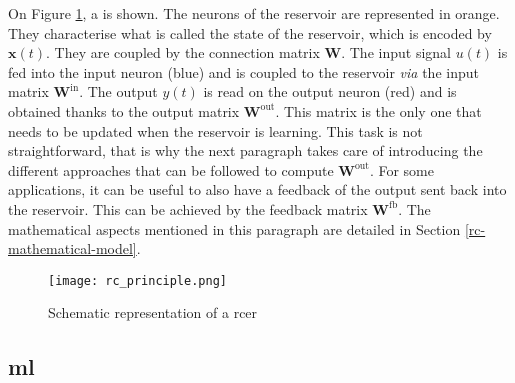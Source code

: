 On Figure \ref{rc_principle}, a \rcer is shown. The neurons of the reservoir are represented in orange. They characterise what is called the state of the reservoir, which is encoded by $\mathbf{x}(t)$. They are coupled by the connection matrix $\mathbf{W}$. The input signal $u(t)$ is fed into the input neuron (blue) and is coupled to the reservoir \textit{via} the input matrix $\mathbf{W}^{\text{in}}$. The output $y(t)$ is read on the output neuron (red) and is obtained thanks to the output matrix $\mathbf{W}^{\text{out}}$. This matrix is the only one that needs to be updated when the reservoir is learning. This task is not straightforward, that is why the next paragraph takes care of introducing the different approaches that can be followed to compute $\mathbf{W}^{\text{out}}$. For some applications, it can be useful to also have a feedback of the output sent back into the reservoir. This can be achieved by the feedback matrix $\mathbf{W}^{\text{fb}}$. The mathematical aspects mentioned in this paragraph are detailed in Section \ref{rc-mathematical-model}.

\begin{figure}[h]
	\centering
	\texttt{[image: rc\_principle.png]}
	\caption{Schematic representation of a \acrlong{rcer} \cite{financialTimeSeries}}
	\label{rc_principle}
\end{figure}


\subsection{\acrlong{ml}}


